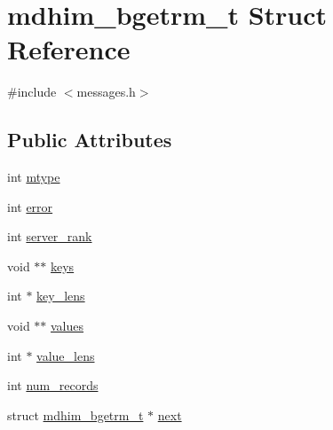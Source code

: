 \hypertarget{structmdhim__bgetrm__t}{\section{mdhim\-\_\-bgetrm\-\_\-t Struct Reference}
\label{d0/d48/structmdhim__bgetrm__t}
}


{\ttfamily \#include $<$messages.\-h$>$}

\subsection*{Public Attributes}
\begin{DoxyCompactItemize}
\item 
int \hyperlink{structmdhim__bgetrm__t_a6d1d78bcd4d55f5341f543246a7636c6}{mtype}
\item 
int \hyperlink{structmdhim__bgetrm__t_a42d5a4b81bd9817f4c31348525d53e37}{error}
\item 
int \hyperlink{structmdhim__bgetrm__t_a3113667adc0eafe85d22c273766bce7f}{server\-\_\-rank}
\item 
void $\ast$$\ast$ \hyperlink{structmdhim__bgetrm__t_adb7029ca1238649fc6b838e21dc1e1fc}{keys}
\item 
int $\ast$ \hyperlink{structmdhim__bgetrm__t_a4edb37ec3da3413607e3eeda3f224525}{key\-\_\-lens}
\item 
void $\ast$$\ast$ \hyperlink{structmdhim__bgetrm__t_a322850d7fda46b0c170ca98342a81779}{values}
\item 
int $\ast$ \hyperlink{structmdhim__bgetrm__t_add99791a3bc82e16120388d1dc0f3ba7}{value\-\_\-lens}
\item 
int \hyperlink{structmdhim__bgetrm__t_a3d398b31f450603e67b854ab563180e8}{num\-\_\-records}
\item 
struct \hyperlink{structmdhim__bgetrm__t}{mdhim\-\_\-bgetrm\-\_\-t} $\ast$ \hyperlink{structmdhim__bgetrm__t_aeb24801d3c8827a0ca7611312e28e568}{next}
\end{DoxyCompactItemize}


